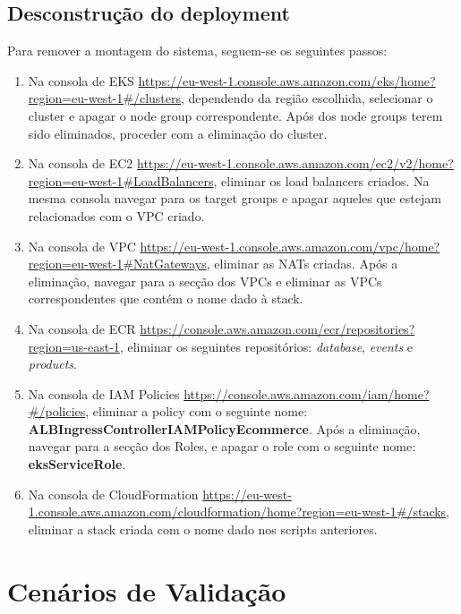 \documentclass[11pt,a4paper]{article}
\begin{document}
\subsection{Desconstrução do deployment}
Para remover a montagem do sistema, seguem-se os seguintes passos:
\begin{enumerate}
	\item Na consola de EKS \url{https://eu-west-1.console.aws.amazon.com/eks/home?region=eu-west-1#/clusters}, dependendo da região escolhida, selecionar o cluster e apagar o node group correspondente. Após dos node groups terem sido eliminados, proceder com a eliminação do cluster.
	\item Na consola de EC2 \url{https://eu-west-1.console.aws.amazon.com/ec2/v2/home?region=eu-west-1#LoadBalancers}, eliminar os load balancers criados. Na mesma consola navegar para os target groups e apagar aqueles que estejam relacionados com o VPC criado.
	\item Na consola de VPC \url{https://eu-west-1.console.aws.amazon.com/vpc/home?region=eu-west-1#NatGateways}, eliminar as NATs criadas. Após a eliminação, navegar para a secção dos VPCs e eliminar as VPCs correspondentes que contém o nome dado à stack.
	\item Na consola de ECR \url{https://console.aws.amazon.com/ecr/repositories?region=us-east-1}, eliminar os seguintes repositórios: \textit{database}, \textit{events} e \textit{products}.
	\item Na consola de IAM Policies \url{https://console.aws.amazon.com/iam/home?#/policies}, eliminar a policy com o seguinte nome: \textbf{ALBIngressControllerIAMPolicyEcommerce}. Após a eliminação, navegar para a secção dos Roles, e apagar o role com o seguinte nome: \textbf{eksServiceRole}.
	\item Na consola de CloudFormation \url{https://eu-west-1.console.aws.amazon.com/cloudformation/home?region=eu-west-1#/stacks}, eliminar a stack criada com o nome dado nos scripts anteriores.
\end{enumerate}

\section{Cenários de Validação}
\end{document}
